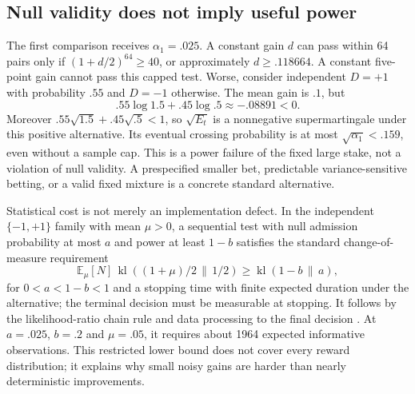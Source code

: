 \documentclass[10pt,twocolumn]{article}
\newcommand{\E}{\mathbb{E}}
\begin{document}
\subsection{Null validity does not imply useful power}
The first comparison receives $\alpha_1=.025$. A constant gain $d$ can pass
within 64 pairs only if $(1+d/2)^{64}\geq40$, or approximately
$d\geq.118664$. A constant five-point gain cannot pass this capped test.
Worse, consider independent $D=+1$ with probability $.55$ and $D=-1$ otherwise.
The mean gain is $.1$, but
\begin{equation}
 .55\log1.5+.45\log.5\approx-.08891<0.
\end{equation}
Moreover $.55\sqrt{1.5}+.45\sqrt{.5}<1$, so $\sqrt{E_t}$ is a nonnegative
supermartingale under this positive alternative. Its eventual crossing
probability is at most $\sqrt{\alpha_1}<.159$, even without a sample cap.
This is a power failure of the fixed large stake, not a violation of null
validity. A prespecified smaller bet, predictable variance-sensitive betting,
or a valid fixed mixture is a concrete standard alternative.

Statistical cost is not merely an implementation defect. In the independent
$\{-1,+1\}$ family with mean $\mu>0$, a sequential test with null admission
probability at most $a$ and power at least $1-b$ satisfies the standard
change-of-measure requirement
\begin{equation}\label{eq:kl}
 \E_\mu[N]\,\operatorname{kl}((1+\mu)/2\,\|\,1/2)
 \geq\operatorname{kl}(1-b\,\|\,a),
\end{equation}
for $0<a<1-b<1$ and a stopping time with finite expected duration under
the alternative; the terminal decision must be measurable at stopping. It
follows by the likelihood-ratio
chain rule and data processing to the final decision
\citep{kaufmann2016complexity}. At $a=.025$, $b=.2$ and $\mu=.05$, it requires
about 1964 expected informative observations. This restricted lower bound does
not cover every reward distribution; it explains why small noisy gains are
harder than nearly deterministic improvements.
\end{document}
